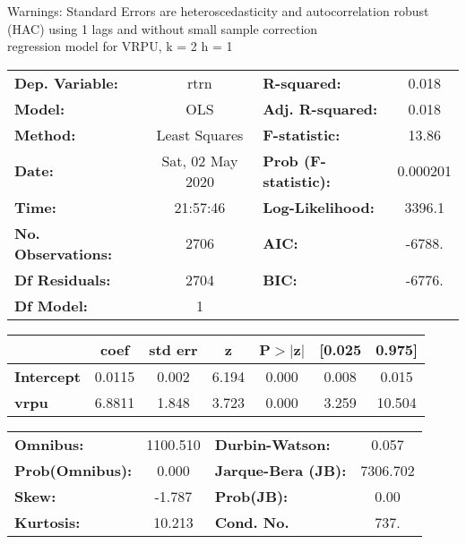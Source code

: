 Warnings: \newline
 [1] Standard Errors are heteroscedasticity and autocorrelation robust (HAC) using 1 lags and without small sample correction\\ 

regression model for VRPU, k = 2 h = 1\begin{center}
\begin{tabular}{lclc}
\toprule
\textbf{Dep. Variable:}    &       rtrn       & \textbf{  R-squared:         } &     0.018   \\
\textbf{Model:}            &       OLS        & \textbf{  Adj. R-squared:    } &     0.018   \\
\textbf{Method:}           &  Least Squares   & \textbf{  F-statistic:       } &     13.86   \\
\textbf{Date:}             & Sat, 02 May 2020 & \textbf{  Prob (F-statistic):} &  0.000201   \\
\textbf{Time:}             &     21:57:46     & \textbf{  Log-Likelihood:    } &    3396.1   \\
\textbf{No. Observations:} &        2706      & \textbf{  AIC:               } &    -6788.   \\
\textbf{Df Residuals:}     &        2704      & \textbf{  BIC:               } &    -6776.   \\
\textbf{Df Model:}         &           1      & \textbf{                     } &             \\
\bottomrule
\end{tabular}
\begin{tabular}{lcccccc}
                   & \textbf{coef} & \textbf{std err} & \textbf{z} & \textbf{P$> |$z$|$} & \textbf{[0.025} & \textbf{0.975]}  \\
\midrule
\textbf{Intercept} &       0.0115  &        0.002     &     6.194  &         0.000        &        0.008    &        0.015     \\
\textbf{vrpu}      &       6.8811  &        1.848     &     3.723  &         0.000        &        3.259    &       10.504     \\
\bottomrule
\end{tabular}
\begin{tabular}{lclc}
\textbf{Omnibus:}       & 1100.510 & \textbf{  Durbin-Watson:     } &    0.057  \\
\textbf{Prob(Omnibus):} &   0.000  & \textbf{  Jarque-Bera (JB):  } & 7306.702  \\
\textbf{Skew:}          &  -1.787  & \textbf{  Prob(JB):          } &     0.00  \\
\textbf{Kurtosis:}      &  10.213  & \textbf{  Cond. No.          } &     737.  \\
\bottomrule
\end{tabular}
\end{center}

